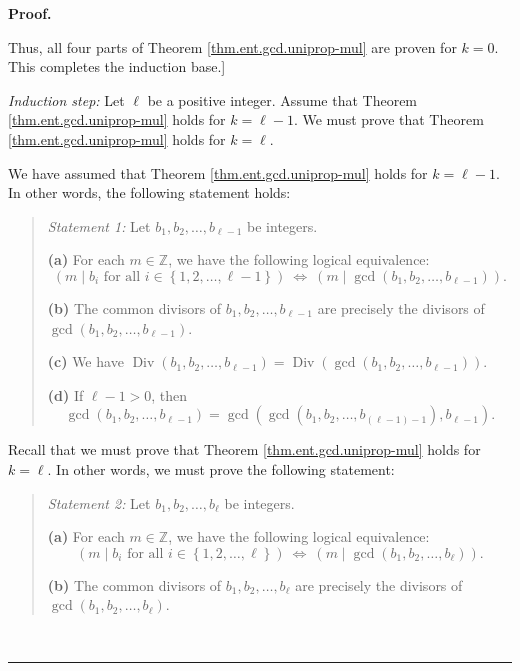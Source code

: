 \documentclass[numbers=enddot,12pt,final,onecolumn,notitlepage]{scrartcl}%
\numberwithin{exer}{subsection}
\theoremstyle{definition}
\newenvironment{statement}{\begin{quote}}{\end{quote}}
\newenvironment{fineprint}{\begin{small}}{\end{small}}
\newenvironment{proof}[1][Proof]{\noindent\textbf{#1.} }{\ \rule{0.5em}{0.5em}}
\begin{document}
\begin{proof}
\begin{fineprint}
Thus, all four parts of Theorem \ref{thm.ent.gcd.uniprop-mul} are proven for
$k=0$. This completes the induction base.]
\end{fineprint}

\textit{Induction step:} Let $\ell$ be a positive integer. Assume that Theorem
\ref{thm.ent.gcd.uniprop-mul} holds for $k=\ell-1$. We must prove that Theorem
\ref{thm.ent.gcd.uniprop-mul} holds for $k=\ell$.

We have assumed that Theorem \ref{thm.ent.gcd.uniprop-mul} holds for
$k=\ell-1$. In other words, the following statement holds:

\begin{statement}
\textit{Statement 1:} Let $b_{1},b_{2},\ldots,b_{\ell-1}$ be integers.

\textbf{(a)} For each $m\in\mathbb{Z}$, we have the following logical
equivalence:%
\[
\left(  m\mid b_{i}\text{ for all }i\in\left\{  1,2,\ldots,\ell-1\right\}
\right)  \ \Longleftrightarrow\ \left(  m\mid\gcd\left(  b_{1},b_{2}%
,\ldots,b_{\ell-1}\right)  \right)  .
\]


\textbf{(b)} The common divisors of $b_{1},b_{2},\ldots,b_{\ell-1}$ are
precisely the divisors of $\gcd\left(  b_{1},b_{2},\ldots,b_{\ell-1}\right)  $.

\textbf{(c)} We have $\operatorname*{Div}\left(  b_{1},b_{2},\ldots,b_{\ell
-1}\right)  =\operatorname*{Div}\left(  \gcd\left(  b_{1},b_{2},\ldots
,b_{\ell-1}\right)  \right)  $.

\textbf{(d)} If $\ell-1>0$, then%
\[
\gcd\left(  b_{1},b_{2},\ldots,b_{\ell-1}\right)  =\gcd\left(  \gcd\left(
b_{1},b_{2},\ldots,b_{\left(  \ell-1\right)  -1}\right)  ,b_{\ell-1}\right)
.
\]

\end{statement}

Recall that we must prove that Theorem \ref{thm.ent.gcd.uniprop-mul} holds for
$k=\ell$. In other words, we must prove the following statement:

\begin{statement}
\textit{Statement 2:} Let $b_{1},b_{2},\ldots,b_{\ell}$ be integers.

\textbf{(a)} For each $m\in\mathbb{Z}$, we have the following logical
equivalence:%
\[
\left(  m\mid b_{i}\text{ for all }i\in\left\{  1,2,\ldots,\ell\right\}
\right)  \ \Longleftrightarrow\ \left(  m\mid\gcd\left(  b_{1},b_{2}%
,\ldots,b_{\ell}\right)  \right)  .
\]


\textbf{(b)} The common divisors of $b_{1},b_{2},\ldots,b_{\ell}$ are
precisely the divisors of $\gcd\left(  b_{1},b_{2},\ldots,b_{\ell}\right)  $.


\end{statement}
\end{proof}
\end{document}
